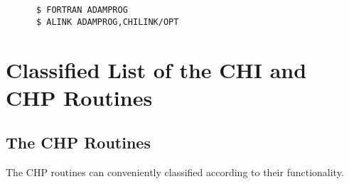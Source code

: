 \begin{verbatim}
      $ FORTRAN ADAMPROG
      $ ALINK ADAMPROG,CHILINK/OPT
\end{verbatim}

\appendix

\newpage
\section {Classified List of the CHI and CHP Routines}

\subsection {The CHP Routines}

The CHP routines can conveniently classified according to their functionality.


